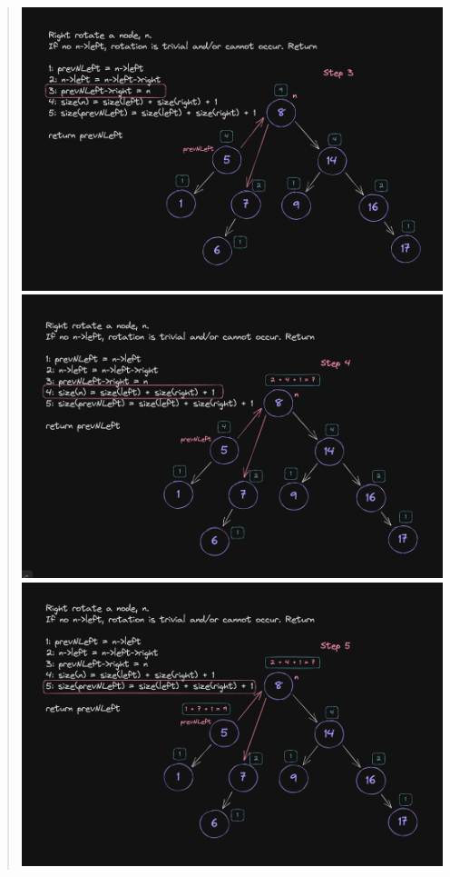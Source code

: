 \documentclass[11pt]{article}
\begin{document}
\begin{enumerate}
\begin{enumerate}
\begin{quote}
           \newline
           \includegraphics[scale=0.3]{right_rotations/rr3.png}         
           \newline
           \includegraphics[scale=0.3]{right_rotations/rr4.png}         
           \newline
           \includegraphics[scale=0.3]{right_rotations/rr5.png}         

\end{quote}
\end{enumerate}
\end{enumerate}
\end{document}
